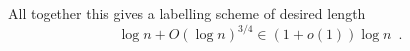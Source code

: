 All together this gives a labelling scheme of desired length 
\[\log n + O(\log n)^{3/4}\in (1 + o(1))\log n\enspace.\]



